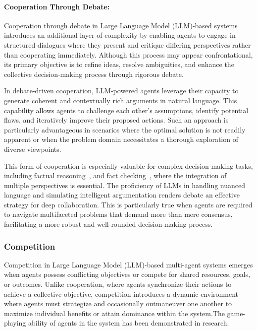 \paragraph{Cooperation Through Debate:}

Cooperation through debate in Large Language Model (LLM)-based systems introduces an additional layer of complexity by enabling agents to engage in structured dialogues where they present and critique differing perspectives rather than cooperating immediately. Although this process may appear confrontational, its primary objective is to refine ideas, resolve ambiguities, and enhance the collective decision-making process through rigorous debate.

In debate-driven cooperation, LLM-powered agents leverage their capacity to generate coherent and contextually rich arguments in natural language. This capability allows agents to challenge each other’s assumptions, identify potential flaws, and iteratively improve their proposed actions. Such an approach is particularly advantageous in scenarios where the optimal solution is not readily apparent or when the problem domain necessitates a thorough exploration of diverse viewpoints.

This form of cooperation is especially valuable for complex decision-making tasks, including factual reasoning~\cite{debate_improve_llm_1}, and fact checking~\cite{debate_2}, where the integration of multiple perspectives is essential. The proficiency of LLMs in handling nuanced language and simulating intelligent argumentation renders debate an effective strategy for deep collaboration. This is particularly true when agents are required to navigate multifaceted problems that demand more than mere consensus, facilitating a more robust and well-rounded decision-making process.

\subsubsection{Competition}

Competition in Large Language Model (LLM)-based multi-agent systems emerges when agents possess conflicting objectives or compete for shared resources, goals, or outcomes. Unlike cooperation, where agents synchronize their actions to achieve a collective objective, competition introduces a dynamic environment where agents must strategize and occasionally outmaneuver one another to maximize individual benefits or attain dominance within the system.The game-playing ability of agents in the system has been demonstrated in research. ~\cite{evaluating_llm_game_ability}

